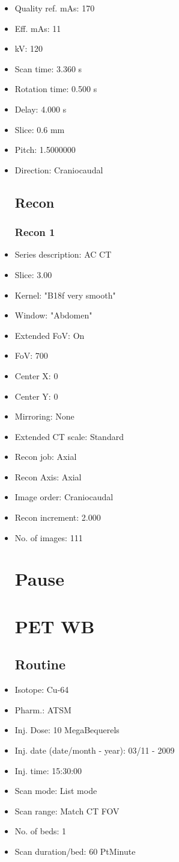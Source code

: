 \documentclass[12pt]{article}
\begin{document}
\begin{itemize}
\subsection{Scan}
\item Quality ref. mAs: 170\item Eff. mAs: 11\item kV: 120\item Scan time: 3.360 s\item Rotation time: 0.500 s\item Delay: 4.000 s\item Slice: 0.6 mm\item Pitch: 1.5000000\item Direction: Craniocaudal
\subsection{Recon}

\subsubsection{Recon 1}
\item Series description: AC CT
\item Slice: 3.00
\item Kernel: "B18f very smooth"
\item Window: "Abdomen"
\item Extended FoV: On
\item FoV: 700
\item Center X: 0
\item Center Y: 0
\item Mirroring: None
\item Extended CT scale: Standard
\item Recon job: Axial
\item Recon Axis: Axial
\item Image order: Craniocaudal
\item Recon increment: 2.000
\item No. of images: 111
\section{Pause}

\section{PET WB}
\subsection{Routine}
\item Isotope: Cu-64
\item Pharm.: ATSM
\item Inj. Dose: 10 MegaBequerels
\item Inj. date (date/month - year): 03/11 - 2009
\item Inj. time: 15:30:00
\item Scan mode: List mode
\item Scan range: Match CT FOV
\item No. of beds: 1
\item Scan duration/bed: 60 PtMinute

\end{itemize}
\end{document}
